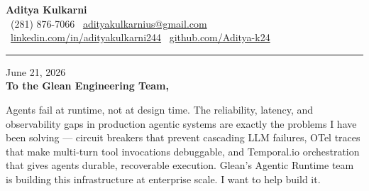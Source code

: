 \documentclass[11pt,letterpaper]{article}
\begin{document}
\begin{center}
    {\Huge \textbf{\color{GleanBlue} Aditya Kulkarni}}\\[8pt]
    {\color{DarkGrey} \small
    \faPhone \ (281) 876-7066 \quad \textbar \quad
    \faEnvelope \ \href{mailto:adityakulkarnius@gmail.com}{adityakulkarnius@gmail.com} \\[4pt]
    \faLinkedin \ \href{https://linkedin.com/in/adityakulkarni244}{linkedin.com/in/adityakulkarni244} \quad \textbar \quad
    \faGithub \ \href{https://github.com/Aditya-k24}{github.com/Aditya-k24}
    }
\end{center}
\vspace{-4pt}
{\color{GleanBlue}\rule{\linewidth}{1.5pt}}
\vspace{10pt}

June 21, 2026\\[10pt]
\textbf{To the Glean Engineering Team,}

\vspace{6pt}

Agents fail at runtime, not at design time. The reliability, latency, and observability gaps in production agentic systems are exactly the problems I have been solving --- circuit breakers that prevent cascading LLM failures, OTel traces that make multi-turn tool invocations debuggable, and Temporal.io orchestration that gives agents durable, recoverable execution. Glean's Agentic Runtime team is building this infrastructure at enterprise scale. I want to help build it.
\end{document}
